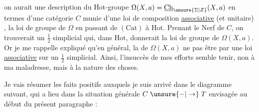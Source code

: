 on aurait une description du $\mathrm{Hot}$-groupe $\Omega(X,a)=\underline{\mathrm{Ch}}_{\unsure{\Sigma|Z}}(X,a)$ en termes d'une
 catégorie $C$ munie d'une loi de composition \uline{associative} (et unitaire) ,  la loi de groupe de $\Omega$ en passant de $(\mathrm{Cat})$ à $\mathrm{Hot}$. Prenant le Nerf de $C$, on trouverait un  $\frac12$ simplicial qui, dans $\mathrm{Hot}$, donnerait la loi de groupe de $\Omega(X,a)$. Or je me rappelle  expliqué qu'en général, la  de $\Omega(X,a)$ ne  pas être  par une loi \uline{associative} sur un  $\frac12$ simplicial. Ainsi, l'insuccès de mes efforts semble tenir, non à ma maladresse, mais à la nature des choses.

Je vais résumer les faits positifs auxquels je suis arrivé dans le diagramme suivant, qui a lieu dans la situation générale $C\mathrel{\unsure{-|\to}}T$ envisagée au début du présent paragraphe :
